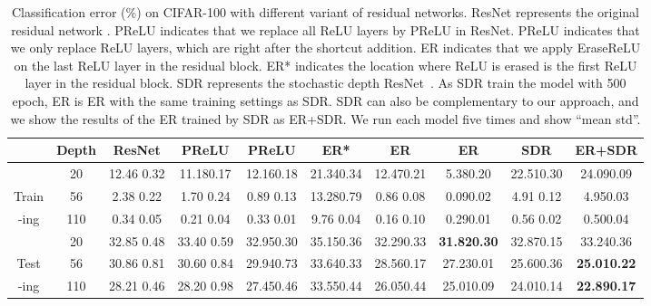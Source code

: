 \documentclass[10pt,twocolumn,letterpaper]{article}
\begin{document}
\begin{table*}[!t]
\centering
\setlength{\tabcolsep}{2.6pt}
\begin{tabular}{|c|c|c|c|c|c|c||c|c|c|} \hline
          & Depth&ResNet          & PReLU  & PReLU  & ER*           & ER             & ER   & SDR             &{\bf ER+SDR} \\
       	  \hline
          & 20   &12.46 0.32 & 11.180.17 & 12.160.18 &21.340.34 & 12.470.21 & 5.380.20 & 22.510.30 &24.090.09    \\
Train    & 56   &2.38  0.22 & 1.70 0.24 & 0.89 0.13 &13.280.79 & 0.86 0.08 & 0.090.02 & 4.91 0.12 & 4.950.03    \\
 -ing     & 110  &0.34  0.05 & 0.21 0.04 & 0.33 0.01 &9.76 0.04 & 0.16 0.10 & 0.290.01 & 0.56 0.02 & 0.500.04    \\
          \hline
          & 20   &32.85 0.48& 33.40 0.59 & 32.950.30 &35.150.36 & 32.290.33 &{\bf 31.820.30}& 32.870.15&33.240.36 \\
Test     & 56   &30.86 0.81& 30.60 0.84 & 29.940.73 &33.640.33 & 28.560.17 & 27.230.01 & 25.600.36 &{\bf 25.010.22} \\
 -ing     & 110  &28.21 0.46& 28.20 0.98 & 27.450.46 &33.550.44 & 26.050.44 & 25.010.09 & 24.010.14 &{\bf 22.890.17} \\
          \hline
\end{tabular}
\vspace{2mm}
\caption{Classification error (\%) on CIFAR-100 with different variant of residual networks. ResNet represents the original residual network \cite{he2016deep}.
PReLU indicates that we replace all ReLU layers by PReLU in ResNet. PReLU indicates that we only replace ReLU layers, which are right after the shortcut addition.
ER indicates that we apply EraseReLU on the last ReLU layer in the residual block.
ER* indicates the location where ReLU is erased is the first ReLU layer in the residual block.
SDR represents the stochastic depth ResNet~\cite{huang2016deep}.
As SDR train the model with 500 epoch, ER is ER with the same training settings as SDR.
SDR can also be complementary to our approach, and we show the results of the ER trained by SDR as ER+SDR.
We run each model five times and show ``mean  std''.
}
\vspace{-2mm}
\label{table:depth}
\end{table*}
\end{document}
